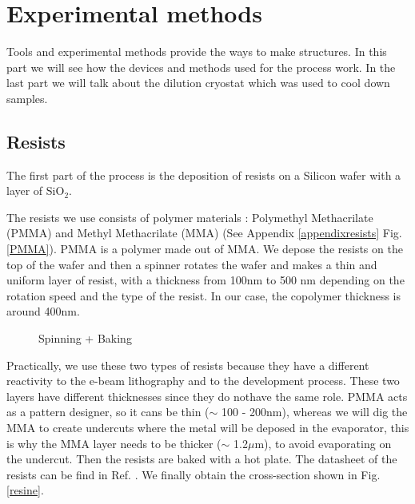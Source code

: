 \pagestyle{fancy}
\chapter{Experimental methods}
\label{Chap2}
    
    Tools and experimental methods provide the ways to make structures. In this part we will see how the devices and methods used for the process work. In the last part we will talk about the dilution cryostat which was used to cool down samples.

    \section{Resists}
        
        The first part of the process is the deposition of resists on a Silicon wafer with a layer of SiO$_2$.

The resists we use consists of polymer materials : Polymethyl Methacrilate (PMMA) and Methyl Methacrilate (MMA) (See Appendix \ref{appendixresists} Fig. \ref{PMMA}). PMMA is a polymer made out of MMA.
            We depose the resists on the top of the wafer and then a spinner rotates the wafer and makes a thin and uniform layer of resist, with a thickness from 100nm to 500 nm depending on the rotation speed and the type of the resist. In our case, the copolymer thickness is around 400nm.
            
            \begin{figure}
                \centering
                \caption{Spinning + Baking}
            \end{figure}
                   
            Practically, we use these two types of resists because they have a different reactivity to the e-beam lithography and to the development process. These two layers have different thicknesses since they do nothave the same role. PMMA acts as a pattern designer, so it cans be thin ($\sim$ 100 - 200nm), whereas we will dig the MMA to create undercuts where the metal will be deposed in the evaporator, this is why the MMA layer needs to be thicker ($\sim$ 1.2$\mu$m), to avoid evaporating on the undercut. 
         Then the resists are baked with a hot plate. The datasheet of the resists can be find in Ref. \cite{Datasheet}. We finally obtain the cross-section shown in Fig. \ref{resine}.
            
